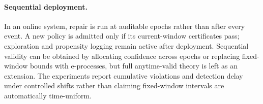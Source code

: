 \paragraph{Sequential deployment.}
In an online system, repair is run at auditable epochs rather than after every event. A new policy is admitted only if its current-window certificates pass; exploration and propensity logging remain active after deployment. Sequential validity can be obtained by allocating confidence across epochs or replacing fixed-window bounds with e-processes, but full anytime-valid theory is left as an extension. The experiments report cumulative violations and detection delay under controlled shifts rather than claiming fixed-window intervals are automatically time-uniform.
